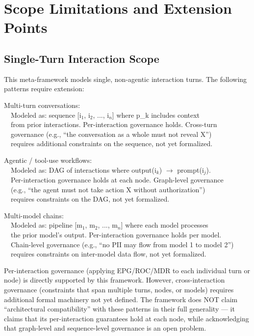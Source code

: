 \section{Scope Limitations and Extension Points}
\label{sec:framework-14}


\subsection{Single-Turn Interaction Scope}


This meta-framework models single, non-agentic interaction turns. The following patterns require extension:

\begin{claddisp}
Multi-turn conversations:\\
~~Modeled as: sequence [i$_1$, i$_2$, ..., i$_n$] where p\_k includes context\\
~~from prior interactions. Per-interaction governance holds. Cross-turn\\
~~governance (e.g., ``the conversation as a whole must not reveal X'')\\
~~requires additional constraints on the sequence, not yet formalized.
\par\smallskip
Agentic / tool-use workflows:\\
~~Modeled as: DAG of interactions where output(i$_k$) $\to$ prompt(i$_j$).\\
~~Per-interaction governance holds at each node. Graph-level governance\\
~~(e.g., ``the agent must not take action X without authorization'')\\
~~requires constraints on the DAG, not yet formalized.
\par\smallskip
Multi-model chains:\\
~~Modeled as: pipeline [m$_1$, m$_2$, ..., m$_n$] where each model processes\\
~~the prior model's output. Per-interaction governance holds per model.\\
~~Chain-level governance (e.g., ``no PII may flow from model 1 to model 2'')\\
~~requires constraints on inter-model data flow, not yet formalized.
\end{claddisp}


Per-interaction governance (applying EPG/ROC/MDR to each individual turn or node) is directly supported by this framework. However, cross-interaction governance (constraints that span multiple turns, nodes, or models) requires additional formal machinery not yet defined. The framework does NOT claim ``architectural compatibility'' with these patterns in their full generality --- it claims that its per-interaction guarantees hold at each node, while acknowledging that graph-level and sequence-level governance is an open problem.

